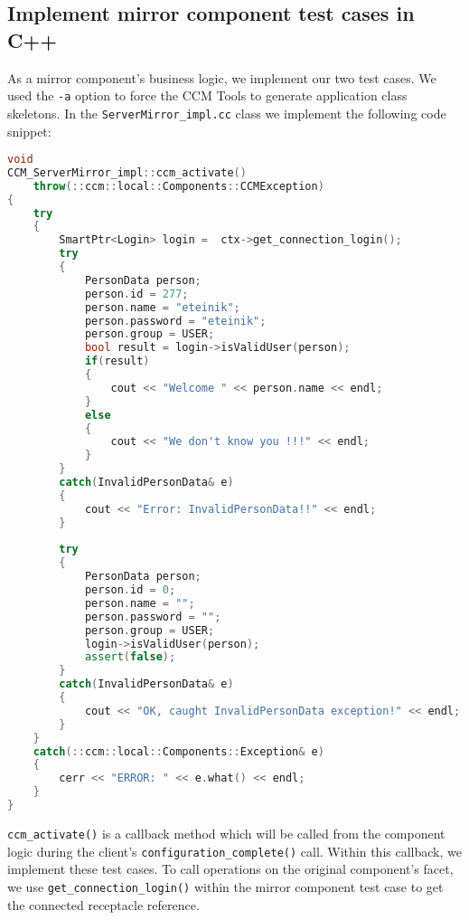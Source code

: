 \subsection{Implement mirror component test cases in C++}
\label{subsection:ImplementMirrorComponentTestCasesCxx}

As a mirror component's business logic, we implement our two test cases.
We used the {\tt -a} option to force the CCM Tools to generate application class
skeletons.
In the {\tt ServerMirror\_impl.cc} class we implement the following code snippet:
\begin{footnotesize}
\begin{lstlisting}[language=C++]
void
CCM_ServerMirror_impl::ccm_activate()
    throw(::ccm::local::Components::CCMException)
{
    try
    {
        SmartPtr<Login> login =  ctx->get_connection_login();
        try 
        {
            PersonData person;
            person.id = 277;
            person.name = "eteinik";
            person.password = "eteinik";
            person.group = USER;
            bool result = login->isValidUser(person);
            if(result) 
            {
                cout << "Welcome " << person.name << endl;
            }
            else 
            {
                cout << "We don't know you !!!" << endl;
            }
        }
        catch(InvalidPersonData& e) 
        {
            cout << "Error: InvalidPersonData!!" << endl;
        }
        
        try 
        {
            PersonData person;
            person.id = 0;
            person.name = "";
            person.password = "";
            person.group = USER;      
            login->isValidUser(person);
            assert(false);
        }
        catch(InvalidPersonData& e) 
        {
            cout << "OK, caught InvalidPersonData exception!" << endl;
        }
    }
    catch(::ccm::local::Components::Exception& e)
    {
        cerr << "ERROR: " << e.what() << endl;
    }
}
\end{lstlisting} 
\end{footnotesize}

{\tt ccm\_activate()} is a callback method which will be called from the component 
logic during the client's {\tt configuration\_complete()} call.
Within this callback, we implement these test cases. 
To call operations on the original component's facet, we use {\tt get\_connection\_login()} 
within the mirror component test case to get the connected receptacle reference. 

